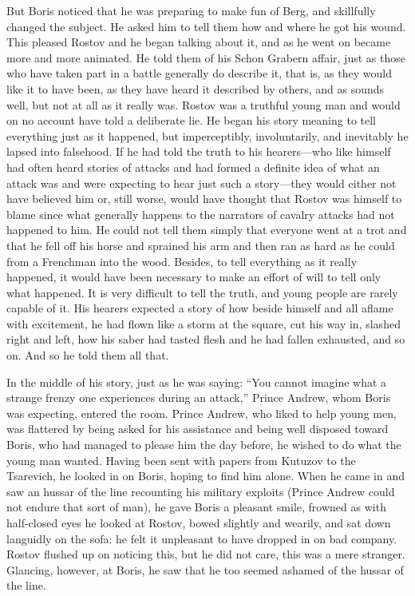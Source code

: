 But Boris noticed that he was preparing to make fun of Berg, and
skillfully changed the subject. He asked him to tell them how and
where he got his wound. This pleased Rostov and he began talking
about it, and as he went on became more and more animated. He
told them of his Schon Grabern affair, just as those who have
taken part in a battle generally do describe it, that is, as they
would like it to have been, as they have heard it described by
others, and as sounds well, but not at all as it really
was. Rostov was a truthful young man and would on no account have
told a deliberate lie. He began his story meaning to tell
everything just as it happened, but imperceptibly, involuntarily,
and inevitably he lapsed into falsehood. If he had told the truth
to his hearers---who like himself had often heard stories of
attacks and had formed a definite idea of what an attack was and
were expecting to hear just such a story---they would either not
have believed him or, still worse, would have thought that Rostov
was himself to blame since what generally happens to the
narrators of cavalry attacks had not happened to him. He could
not tell them simply that everyone went at a trot and that he
fell off his horse and sprained his arm and then ran as hard as
he could from a Frenchman into the wood. Besides, to tell
everything as it really happened, it would have been necessary to
make an effort of will to tell only what happened. It is very
difficult to tell the truth, and young people are rarely capable
of it. His hearers expected a story of how beside himself and all
aflame with excitement, he had flown like a storm at the square,
cut his way in, slashed right and left, how his saber had tasted
flesh and he had fallen exhausted, and so on. And so he told them
all that.

In the middle of his story, just as he was saying: ``You cannot
imagine what a strange frenzy one experiences during an attack,''
Prince Andrew, whom Boris was expecting, entered the room. Prince
Andrew, who liked to help young men, was flattered by being asked
for his assistance and being well disposed toward Boris, who had
managed to please him the day before, he wished to do what the
young man wanted. Having been sent with papers from Kutuzov to
the Tsarevich, he looked in on Boris, hoping to find him
alone. When he came in and saw an hussar of the line recounting
his military exploits (Prince Andrew could not endure that sort
of man), he gave Boris a pleasant smile, frowned as with
half-closed eyes he looked at Rostov, bowed slightly and wearily,
and sat down languidly on the sofa: he felt it unpleasant to have
dropped in on bad company.  Rostov flushed up on noticing this,
but he did not care, this was a mere stranger. Glancing, however,
at Boris, he saw that he too seemed ashamed of the hussar of the
line.

